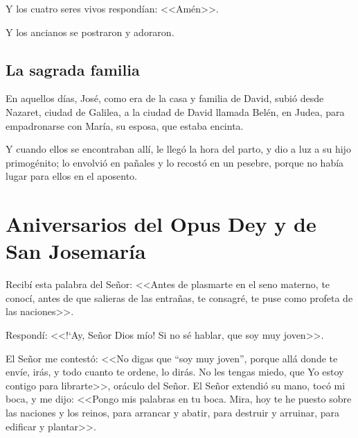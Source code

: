 Y los cuatro seres vivos 
respondían: <<Amén>>.  

Y los ancianos se 
postraron y adoraron. 

\subsection{La sagrada familia}



 En aquellos días,  José, como era de la casa y 
familia de David, subió desde Nazaret, ciudad 
de Galilea, a la ciudad de David llamada 
Belén, en Judea, para empadronarse con 
María, su esposa, que estaba encinta.  

Y cuando 
ellos se encontraban allí, le llegó la hora del 
parto, y dio a luz a su hijo primogénito; lo 
envolvió en pañales y lo recostó en un pesebre, 
porque no había lugar para ellos en el 
aposento. 


\newpage

\section[Aniversarios del Opus Dei]{Aniversarios del Opus Dey y de San Josemaría}



 Recibí esta palabra del Señor: <<Antes de 
plasmarte en el seno materno, te conocí, antes 
de que salieras de las entrañas, te consagré, te 
puse como profeta de las naciones>>.  

Respondí: 
<<!`Ay, Señor Dios mío! Si no sé hablar, que soy 
muy joven>>.  

El Señor me contestó: <<No digas 
que “soy muy joven”, porque allá donde te 
envíe, irás, y todo cuanto te ordene, lo dirás. 
No les tengas miedo, que Yo estoy contigo 
para librarte>>, oráculo del Señor. El Señor 
extendió su mano, tocó mi boca, y me dijo: 
<<Pongo mis palabras en tu boca. Mira, hoy te 
he puesto sobre las naciones y los reinos, para 
arrancar y abatir, para destruir y arruinar, 
para edificar y plantar>>. 





